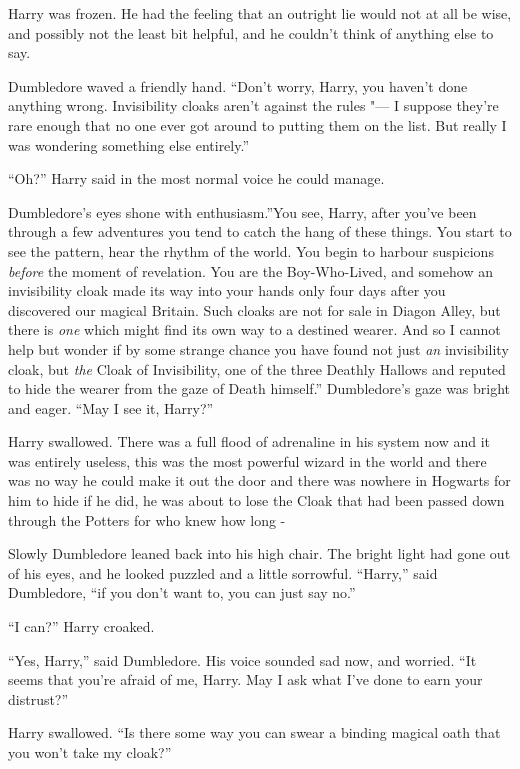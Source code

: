Harry was frozen. He had the feeling that an outright lie would not at
all be wise, and possibly not the least bit helpful, and he couldn't
think of anything else to say.

Dumbledore waved a friendly hand. ``Don't worry, Harry, you haven't done
anything wrong. Invisibility cloaks aren't against the rules "--- I suppose
they're rare enough that no one ever got around to putting them on the
list. But really I was wondering something else entirely.''

``Oh?'' Harry said in the most normal voice he could manage.

Dumbledore's eyes shone with enthusiasm.''You see, Harry, after you've
been through a few adventures you tend to catch the hang of these
things. You start to see the pattern, hear the rhythm of the world. You
begin to harbour suspicions \emph{before} the moment of revelation. You
are the Boy-Who-Lived, and somehow an invisibility cloak made its way
into your hands only four days after you discovered our magical Britain.
Such cloaks are not for sale in Diagon Alley, but there is \emph{one}
which might find its own way to a destined wearer. And so I cannot help
but wonder if by some strange chance you have found not just \emph{an}
invisibility cloak, but \emph{the} Cloak of Invisibility, one of the
three Deathly Hallows and reputed to hide the wearer from the gaze of
Death himself.'' Dumbledore's gaze was bright and eager. ``May I see it,
Harry?''

Harry swallowed. There was a full flood of adrenaline in his system now
and it was entirely useless, this was the most powerful wizard in the
world and there was no way he could make it out the door and there was
nowhere in Hogwarts for him to hide if he did, he was about to lose the
Cloak that had been passed down through the Potters for who knew how
long -

Slowly Dumbledore leaned back into his high chair. The bright light had
gone out of his eyes, and he looked puzzled and a little sorrowful.
``Harry,'' said Dumbledore, ``if you don't want to, you can just say
no.''

``I can?'' Harry croaked.

``Yes, Harry,'' said Dumbledore. His voice sounded sad now, and worried.
``It seems that you're afraid of me, Harry. May I ask what I've done to
earn your distrust?''

Harry swallowed. ``Is there some way you can swear a binding magical
oath that you won't take my cloak?''


